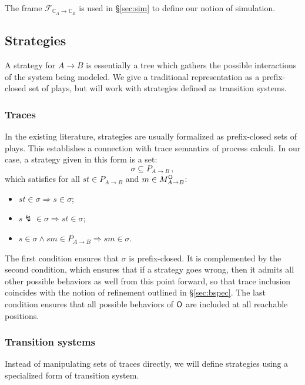 The frame $\mathcal{F}_{\mathbb{C}_A \rightarrow \mathbb{C}_B}$
is used in \S\ref{sec:sim}
to define our notion of simulation.



\subsection{Strategies} %

A strategy for $A \rightarrow B$
is essentially a tree
which gathers the possible interactions of
the system being modeled.
We give a traditional representation
as a prefix-closed set of plays,
but will work with strategies defined as transition systems.

\subsubsection{Traces} %

In the existing literature,
strategies are usually formalized as prefix-closed sets of plays.
This establishes a connection with trace semantics of process calculi.
In our case,
a strategy given in this form is a set:
\[ \sigma \subseteq P_{A \rightarrow B} \,, \]
which satisfies
for all $st \in P_{A \rightarrow B}$
and $m \in M_{A \rightarrow B}^{ \mathsf{O} }$:
\begin{itemize}
  \item $st \in \sigma \Rightarrow s \in \sigma$;
  \item $s\lightning \in \sigma \Rightarrow st \in \sigma$;
  \item $s \in \sigma \wedge sm \in P_{A \rightarrow B}
    \Rightarrow sm \in \sigma$.
\end{itemize}
The first condition ensures that $\sigma$ is prefix-closed.
It is complemented by the second condition,
which ensures that if a strategy goes wrong,
then it admits all other possible behaviors as well
from this point forward,
so that trace inclusion coincides with the notion of refinement
outlined in \S\ref{sec:bspec}.
The last condition ensures that
all possible behaviors of $ \mathsf{O} $ are included
at all reachable positions.


\subsubsection{Transition systems} %

Instead of manipulating sets of traces directly,
we will define strategies using a specialized form of transition system.

